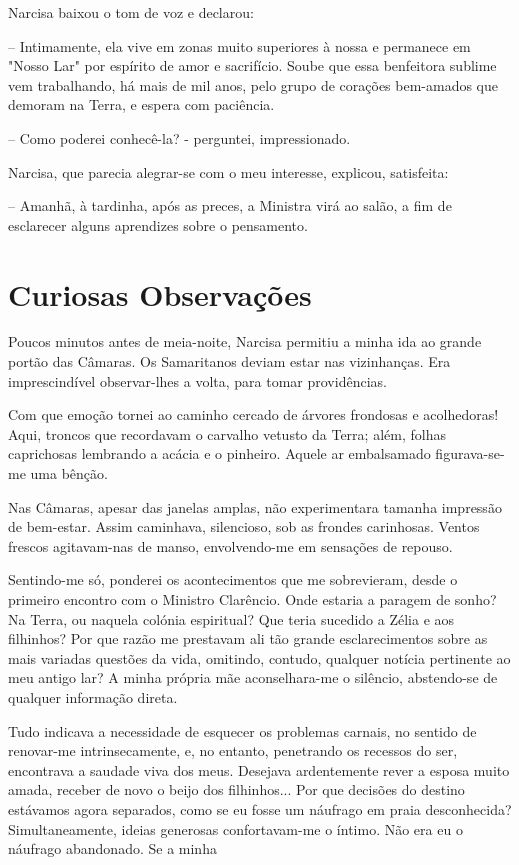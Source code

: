 \documentclass[portuguese,12pt,a4paper]{scrbook}
\begin{document}
	Narcisa baixou o tom de voz e declarou:
	
	– Intimamente, ela vive em zonas muito superiores à nossa e permanece em "Nosso Lar" por espírito de amor e sacrifício. Soube que essa benfeitora sublime vem trabalhando, há mais de mil anos, pelo grupo de corações bem-amados que demoram na Terra, e espera com paciência.
	
	– Como poderei conhecê-la? - perguntei, impressionado.
	
	Narcisa, que parecia alegrar-se com o meu interesse, explicou, satisfeita:
	
	– Amanhã, à tardinha, após as preces, a Ministra virá ao salão, a fim de esclarecer alguns aprendizes sobre o pensamento.
	
	
	\chapter{Curiosas Observações}
	
	Poucos minutos antes de meia-noite, Narcisa permitiu a minha ida ao grande portão das Câmaras. Os Samaritanos deviam estar nas vizinhanças. Era imprescindível observar-lhes a volta, para tomar providências.
	
	Com que emoção tornei ao caminho cercado de árvores frondosas e acolhedoras! Aqui, troncos que recordavam o carvalho vetusto da Terra; além, folhas caprichosas lembrando a acácia e o pinheiro. Aquele ar embalsamado figurava-se-me uma bênção.
	
	Nas Câmaras, apesar das janelas amplas, não experimentara tamanha impressão de bem-estar. Assim caminhava, silencioso, sob as frondes carinhosas. Ventos frescos agitavam-nas de manso, envolvendo-me em sensações de repouso.
	
	Sentindo-me só, ponderei os acontecimentos que me sobrevieram, desde o primeiro encontro com o Ministro Clarêncio. Onde estaria a paragem de sonho? Na Terra, ou naquela colónia espiritual? Que teria sucedido a Zélia e aos filhinhos? Por que razão me prestavam ali tão grande esclarecimentos sobre as mais variadas questões da vida, omitindo, contudo, qualquer notícia pertinente ao meu antigo lar? A minha própria mãe aconselhara-me o silêncio, abstendo-se de qualquer informação direta.
	
	Tudo indicava a necessidade de esquecer os problemas carnais, no sentido de renovar-me intrinsecamente, e, no entanto, penetrando os recessos do ser, encontrava a saudade viva dos meus. Desejava ardentemente rever a esposa muito amada, receber de novo o beijo dos filhinhos... Por que decisões do destino estávamos agora separados, como se eu fosse um náufrago em praia desconhecida? Simultaneamente, ideias generosas confortavam-me o íntimo. Não era eu o náufrago abandonado. Se a minha
	
\end{document}
